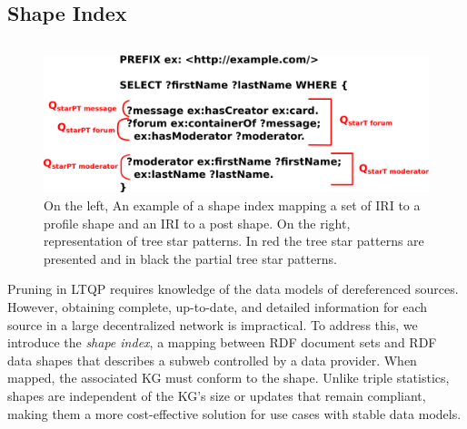 \subsection{Shape Index}

\begin{figure}
   \centering
   \begin{minipage}[t]{0.50\linewidth}
      \centering
      \begin{tabular}{c}
         
      \end{tabular}
      
   \end{minipage}
   \hspace{0.05\textwidth}
   \begin{minipage}[t]{0.30\linewidth}
      \centering
      \includegraphics[width=1\textwidth]{figure/q_star.png}
   \end{minipage}

   \caption{
      On the left, An example of a shape index mapping a set of IRI to a profile shape and an IRI to a post shape.
       On the right, representation of tree star patterns.
       In red the tree star patterns are presented and in black the partial tree star patterns.
       }
   \label{fig:shapeIndex}
\end{figure}

Pruning in LTQP requires knowledge of the data models of dereferenced sources.  
However, obtaining complete, up-to-date, and detailed information for each source in a large decentralized network is impractical.  
To address this, we introduce the \emph{shape index}, a mapping between RDF document sets and RDF data shapes that describes a subweb controlled by a data provider.  
When mapped, the associated KG must conform to the shape.  
Unlike triple statistics, shapes are independent of the KG's size or updates that remain compliant, making them a more cost-effective solution for use cases with stable data models. 

